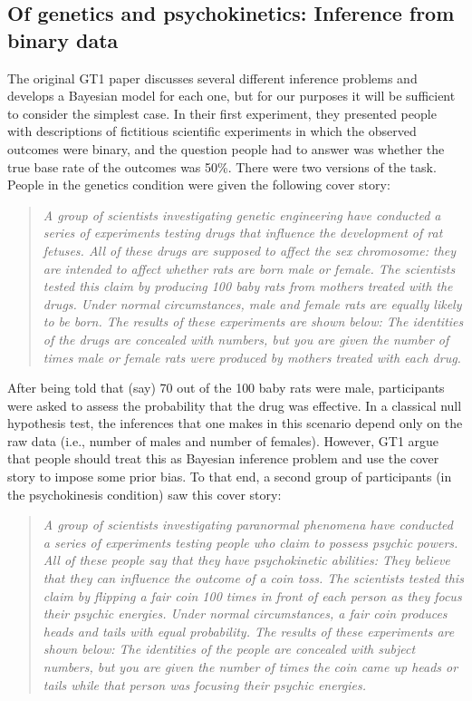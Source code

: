 \documentclass[doc,floatsintext]{apa6}
\begin{document}
\subsection{Of genetics and psychokinetics: Inference from binary data}

The original GT1 paper discusses several different inference problems and develops a Bayesian model for each one, but for our purposes it will be sufficient to consider the simplest case. In their first experiment, they presented people with descriptions of fictitious scientific experiments in which the observed outcomes were binary, and the question people had to answer was whether the true base rate of the outcomes was 50\%. There were two versions of the task. People in the {\sc genetics} condition were given the following cover story:

\begin{quote}
{\it A group of scientists investigating genetic engineering have conducted a series of experiments testing drugs that influence the development of rat fetuses. All of these drugs are supposed to affect the sex chromosome: they are intended to affect whether rats are born male or female. The scientists tested this claim by producing 100 baby rats from mothers treated with the drugs. Under normal circumstances, male and female rats are equally likely to be born. The results of these experiments are shown below: The identities of the drugs are concealed with numbers, but you are given the number of times male or female rats were produced by mothers treated with each drug.}
\end{quote}

\noindent
After being told that (say) 70 out of the 100 baby rats were male, participants were asked to assess the probability that the drug was effective. In a classical null hypothesis test, the inferences that one makes in this scenario depend only on the raw data (i.e., number of males and number of females). However, GT1 argue that people should treat this as Bayesian inference problem and use the cover story to impose some prior bias. To that end, a second group of participants (in the {\sc psychokinesis} condition) saw this cover story:

\begin{quote}
{\it A group of scientists investigating paranormal phenomena have conducted a series of experiments testing people who claim to possess psychic powers. All of these people say that they have psychokinetic abilities: They believe that they can influence the outcome of a coin toss. The scientists tested this claim by flipping a fair coin 100 times in front of each person as they focus their psychic energies. Under normal circumstances, a fair coin produces heads and tails with equal probability. The results of these experiments are shown below: The identities of the people are concealed with subject numbers, but you are given the number of times the coin came up heads or tails while that person was focusing their psychic energies.}
\end{quote}
\end{document}
